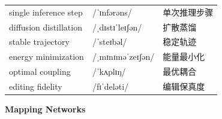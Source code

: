 \documentclass[UTF8,12pt,a4paper]{ctexart}
\providecommand{\zh}[1]{#1}
\begin{document}
\begin{tabular*}{\textwidth}{@{\extracolsep{\fill}}lll@{}}
single inference step & {\ipafont /ˈɪnfərəns/} & \zh{单次推理步骤} \\
diffusion distillation & {\ipafont /ˌdɪstɪˈleɪʃən/} & \zh{扩散蒸馏} \\
stable trajectory & {\ipafont /ˈsteɪbəl/} & \zh{稳定轨迹} \\
energy minimization & {\ipafont /ˌmɪnɪməˈzeɪʃən/} & \zh{能量最小化} \\
optimal coupling & {\ipafont /ˈkʌplɪŋ/} & \zh{最优耦合} \\
editing fidelity & {\ipafont /fɪˈdeləti/} & \zh{编辑保真度} \\
\bottomrule
\end{tabular*}

\newpage

\begin{center}
    {\Large\bfseries Mapping Networks}
\end{center}
\end{document}
